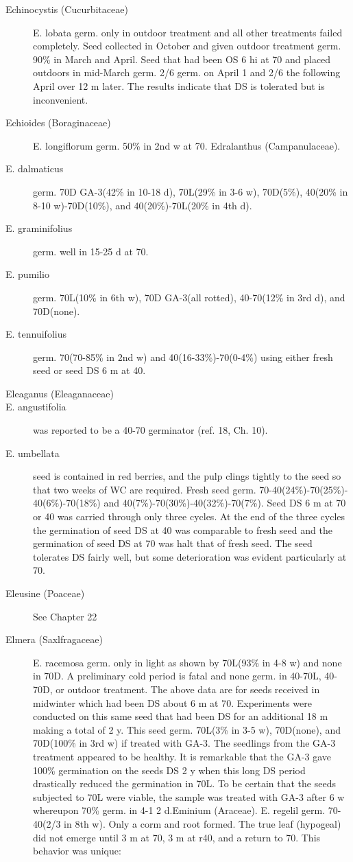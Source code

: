 \begin{description}
\item[Echinocystis (Cucurbitaceae)] E. lobata germ. only in outdoor treatment
and all other treatments failed completely. Seed collected in October and given
outdoor treatment germ. 90\% in March and April. Seed that had been OS 6 hi at 70
and placed outdoors in mid-March germ. 2/6 germ. on April 1 and 2/6 the following
April over 12 m later. The results indicate that DS is tolerated but is inconvenient.

\item[Echioides (Boraginaceae)] E. longiflorum germ. 50\% in 2nd w at 70.
Edralanthus (Campanulaceae).
\item[E. dalmaticus] germ. 70D GA-3(42\% in 10-18 d), 70L(29\% in 3-6 w), 70D(5\%),
40(20\% in 8-10 w)-70D(10\%), and 40(20\%)-70L(20\% in 4th d).
\item[E. graminifolius] germ. well in 15-25 d at 70.
\item[E. pumilio] germ. 70L(10\% in 6th w), 70D GA-3(all rotted), 40-70(12\% in 3rd d),
and 70D(none).
\item[E. tennuifolius] germ. 70(70-85\% in 2nd w) and 40(16-33\%)-70(0-4\%) using
either fresh seed or seed DS 6 m at 40.

\item[Eleaganus (Eleaganaceae)]
\item[E. angustifolia] was reported to be a 40-70 germinator (ref. 18, Ch. 10).

\item[E. umbellata] seed is contained in red berries, and the pulp clings tightly to the
seed so that two weeks of WC are required. Fresh seed germ. 70-40(24\%)-70(25\%)-
40(6\%)-70(18\%) and 40(7\%)-70(30\%)-40(32\%)-70(7\%). Seed DS 6 m at 70 or 40
was carried through only three cycles. At the end of the three cycles the germination of
seed DS at 40 was comparable to fresh seed and the germination of seed DS at 70
was halt that of fresh seed. The seed tolerates DS fairly well, but some deterioration
was evident particularly at 70.

\item[Eleusine (Poaceae)] See Chapter 22

\item[Elmera (Saxlfragaceae)] E. racemosa germ. only in light as shown by
70L(93\% in 4-8 w) and none in 70D. A preliminary cold period is fatal and none germ.
in 40-70L, 40-70D, or outdoor treatment. The above data are for seeds received in
midwinter which had been DS about 6 m at 70. Experiments were conducted on this
same seed that had been DS for an additional 18 m making a total of 2 y. This seed
germ. 70L(3\% in 3-5 w), 70D(none), and 70D(100\% in 3rd w) if treated with GA-3. The
seedlings from the GA-3 treatment appeared to be healthy. It is remarkable that the
GA-3 gave 100\% germination on the seeds DS 2 y when this long DS period
drastically reduced the germination in 70L. To be certain that the seeds subjected to
70L were viable, the sample was treated with GA-3 after 6 w whereupon 70\% germ. in
4-1 2 d.Eminium (Araceae). E. regelil germ. 70-40(2/3 in 8th w). Only a corm and
root formed. The true leaf (hypogeal) did not emerge until 3 m at 70, 3 m at r40, and a
return to 70. This behavior was unique:


\end{description}
